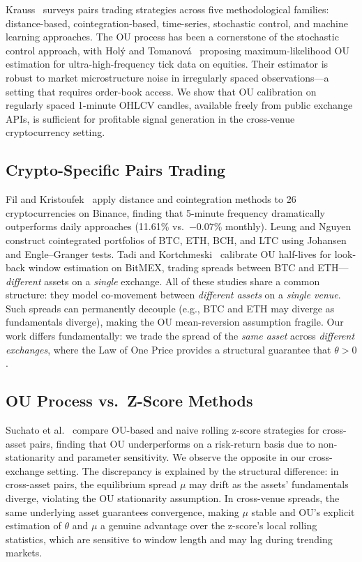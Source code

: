 \documentclass[sigconf,nonacm=false]{acmart}
\begin{document}
Krauss~\cite{krauss2017statistical} surveys pairs trading strategies across five methodological families: distance-based, cointegration-based, time-series, stochastic control, and machine learning approaches. The OU process has been a cornerstone of the stochastic control approach, with Hol\'{y} and Tomanov\'{a}~\cite{holy2018estimation} proposing maximum-likelihood OU estimation for ultra-high-frequency tick data on equities. Their estimator is robust to market microstructure noise in irregularly spaced observations---a setting that requires order-book access. We show that OU calibration on regularly spaced 1-minute OHLCV candles, available freely from public exchange APIs, is sufficient for profitable signal generation in the cross-venue cryptocurrency setting.

\subsection{Crypto-Specific Pairs Trading}

Fil and Kristoufek~\cite{fil2020pairs} apply distance and cointegration methods to 26 cryptocurrencies on Binance, finding that 5-minute frequency dramatically outperforms daily approaches (11.61\% vs.\ $-0.07$\% monthly). Leung and Nguyen~\cite{leung2019constructing} construct cointegrated portfolios of BTC, ETH, BCH, and LTC using Johansen and Engle--Granger tests. Tadi and Kortchmeski~\cite{tadi2021evaluation} calibrate OU half-lives for look-back window estimation on BitMEX, trading spreads between BTC and ETH---\emph{different} assets on a \emph{single} exchange. All of these studies share a common structure: they model co-movement between \emph{different assets} on a \emph{single venue}. Such spreads can permanently decouple (e.g., BTC and ETH may diverge as fundamentals diverge), making the OU mean-reversion assumption fragile. Our work differs fundamentally: we trade the spread of the \emph{same asset} across \emph{different exchanges}, where the Law of One Price provides a structural guarantee that $\theta > 0$.

\subsection{OU Process vs.\ Z-Score Methods}

Suchato et al.~\cite{suchato2024application} compare OU-based and naive rolling z-score strategies for cross-asset pairs, finding that OU underperforms on a risk-return basis due to non-stationarity and parameter sensitivity. We observe the opposite in our cross-exchange setting. The discrepancy is explained by the structural difference: in cross-asset pairs, the equilibrium spread $\mu$ may drift as the assets' fundamentals diverge, violating the OU stationarity assumption. In cross-venue spreads, the same underlying asset guarantees convergence, making $\mu$ stable and OU's explicit estimation of $\theta$ and $\mu$ a genuine advantage over the z-score's local rolling statistics, which are sensitive to window length and may lag during trending markets.
\end{document}
